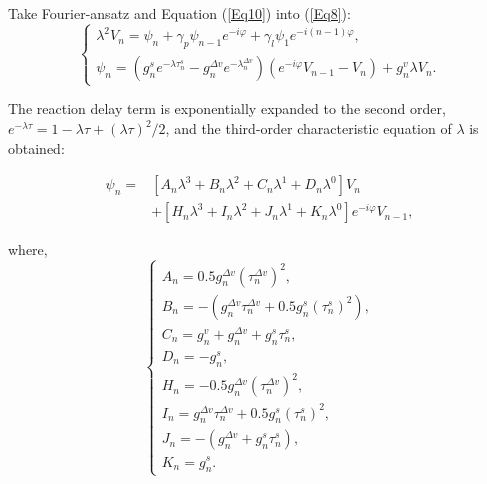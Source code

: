 \documentclass[journal]{IEEEtran}
\begin{document}
Take Fourier-ansatz and Equation (\ref{Eq10}) into (\ref{Eq8}):
\begin{equation}
  \left\{\begin{array}{c}
    \lambda^{2}V_{n}=\psi_{n}+\gamma_{p} \psi_{n-1} e^{-i \varphi}+\gamma_{l} \psi_{1} e^{-i(n-1) \varphi}, \\
    \psi_{n}=\left(g_{n}^{s} e^{-\lambda \tau_{n}^{s}}-g_{n}^{\Delta v} e^{-\lambda_{n}^{\Delta v}}\right)\left(e^{-i \varphi}V_{n-1}-V_{n}\right)+g_{n}^{v} \lambda V_{n}.
  \end{array}\right.
  \label{Eq11}
\end{equation}

The reaction delay term is exponentially expanded to the second order, $e^{-\lambda \tau}=1-\lambda \tau+ ({\lambda \tau})^2/2$, and the third-order characteristic equation of $\lambda$ is obtained:
\begin{small}
  \begin{equation}
    \begin{aligned}
      \psi_{n}\!= & \!\left[A_{n} \lambda^{3}\!+\!B_{n} \lambda^{2}\!+\!C_{n} \lambda^{1}\!+\!D_{n} \lambda^{0}\right] V_{n}                   \\
                  & +\!\left[H_{n} \lambda^{3}\!+\!I_{n} \lambda^{2}\!+\!J_{n} \lambda^{1}\!+\!K_{n} \lambda^{0}\right] e^{-i \varphi}V_{n-1},
      \label{Eq12}
    \end{aligned}
  \end{equation}
\end{small}
where,
\begin{equation}
  \left\{\begin{array}{l}
    A_{n}=0.5 g_{n}^{\Delta v}\left(\tau_{n}^{\Delta v}\right)^{2},                                      \\
    B_{n}=-\left(g_{n}^{\Delta v} \tau_{n}^{\Delta v}+0.5 g_{n}^{s}\left(\tau_{n}^{s}\right)^{2}\right), \\
    C_{n}=g_{n}^{v}+g_{n}^{\Delta v}+g_{n}^{s} \tau_{n}^{s},                                             \\
    D_{n}=-g_{n}^{s},                                                                                    \\
    H_{n}=-0.5 g_{n}^{\Delta v}\left(\tau_{n}^{\Delta v}\right)^{2},                                     \\
    I_{n}=g_{n}^{\Delta v} \tau_{n}^{\Delta v}+0.5g_{n}^{s}\left(\tau_{n}^{s}\right)^{2},                \\
    J_{n}=-\left(g_{n}^{\Delta v}+g_{n}^{s} \tau_{n}^{s}\right),                                         \\
    K_{n}=g_{n}^{s}.
  \end{array}\right.
  \label{Eq13}
\end{equation}
\end{document}
